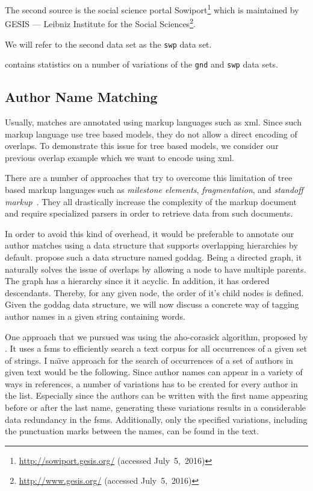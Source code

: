 \bigskip

The second source is the social science portal Sowiport\footnote{\url{http://sowiport.gesis.org/} (accessed July~5,~2016)} which is maintained by GESIS --- Leibniz Institute for the Social Sciences\footnote{\url{http://www.gesis.org/} (accessed July~5,~2016)}.

We will refer to the second data set as the \texttt{swp} data set.

\bigskip

 contains statistics on a number of variations of the \texttt{gnd} and  \texttt{swp} data sets.


\subsection{Author Name Matching}\label{subsec:i-author-name-matching}
Usually, matches are annotated using markup languages such as \gls{xml}.
Since such markup language use tree based models, they do not allow a direct encoding of overlaps.
To demonstrate this issue for tree based models, we consider our previous overlap example which we want to encode using \gls{xml}\@{}.

There are a number of approaches that try to overcome this limitation of tree based markup languages such as \textit{milestone elements}, \textit{fragmentation}, and \textit{standoff markup}~\citep{sperberg2000goddag}. They all drastically increase the complexity of the markup document and require specialized parsers in order to retrieve data from such documents.

In order to avoid this kind of overhead, it would be preferable to annotate our author matches using a data structure that supports overlapping hierarchies by default.
\citet{sperberg2000goddag} propose such a data structure named \acrfull{goddag}.
Being a directed graph, it naturally solves the issue of overlaps by allowing a node to have multiple parents.
The graph has a hierarchy since it it acyclic.
In addition, it has ordered descendants.
Thereby, for any given node, the order of it's child nodes is defined.
Given the \gls{goddag} data structure, we will now discuss a concrete way of tagging author names in a given string containing words.

One approach that we pursued was using the \gls{aho-corasick algorithm}, proposed by \citet{aho1975efficient}.
It uses a \glspl{fsm} to efficiently search a text corpus for all occurrences of a given set of strings.
I na{\"{\i}}ve approach for the search of occurrences of a set of authors in given text would be the following.
Since author names can appear in a variety of ways in references, a number of variations has to be created for every author in the list.
Especially since the authors can be written with the first name appearing before or after the last name, generating these variations results in a considerable data redundancy in the \glspl{fsm}.
Additionally, only the specified variations, including the punctuation marks between the names, can be found in the text.


